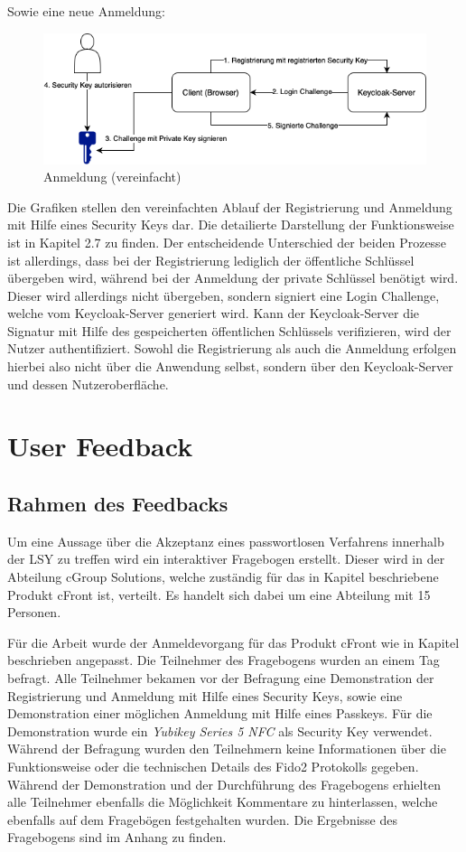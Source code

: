 Sowie eine neue Anmeldung:

\begin{figure}[H]
	\centering 
	\includegraphics[width=1\textwidth]{img/abbildungen/login_simplified.png}
	\captionsetup{format=hang}
	\caption{Anmeldung (vereinfacht)}
\end{figure}

Die Grafiken stellen den vereinfachten Ablauf der Registrierung und Anmeldung mit Hilfe eines Security Keys dar. Die detailierte Darstellung der Funktionsweise ist in Kapitel 2.7 zu finden. Der entscheidende Unterschied der beiden Prozesse ist allerdings, dass bei der Registrierung lediglich der öffentliche Schlüssel übergeben wird, während bei der Anmeldung der private Schlüssel benötigt wird. Dieser wird allerdings nicht übergeben, sondern signiert eine Login Challenge, welche vom Keycloak-Server generiert wird. Kann der Keycloak-Server die Signatur mit Hilfe des gespeicherten öffentlichen Schlüssels verifizieren, wird der Nutzer authentifiziert. Sowohl die Registrierung als auch die Anmeldung erfolgen hierbei also nicht über die Anwendung selbst, sondern über den Keycloak-Server und dessen Nutzeroberfläche.

\section{User Feedback}

\subsection{Rahmen des Feedbacks}
Um eine Aussage über die Akzeptanz eines passwortlosen Verfahrens innerhalb der \ac{LSY} zu treffen wird ein interaktiver Fragebogen erstellt. Dieser wird in der Abteilung cGroup Solutions, welche zuständig für das in Kapitel beschriebene Produkt cFront ist, verteilt. Es handelt sich dabei um eine Abteilung mit 15 Personen. 

Für die Arbeit wurde der Anmeldevorgang für das Produkt cFront wie in Kapitel beschrieben angepasst. Die Teilnehmer des Fragebogens wurden an einem Tag befragt. Alle Teilnehmer bekamen vor der Befragung eine Demonstration der Registrierung und Anmeldung mit Hilfe eines Security Keys, sowie eine Demonstration einer möglichen Anmeldung mit Hilfe eines Passkeys. Für die Demonstration wurde ein \textit{Yubikey Series 5 NFC} als Security Key verwendet. Während der Befragung wurden den Teilnehmern keine Informationen über die Funktionsweise oder die technischen Details des Fido2 Protokolls gegeben. Während der Demonstration und der Durchführung des Fragebogens erhielten alle Teilnehmer ebenfalls die Möglichkeit Kommentare zu hinterlassen, welche ebenfalls auf dem Fragebögen festgehalten wurden. Die Ergebnisse des Fragebogens sind im Anhang zu finden.

